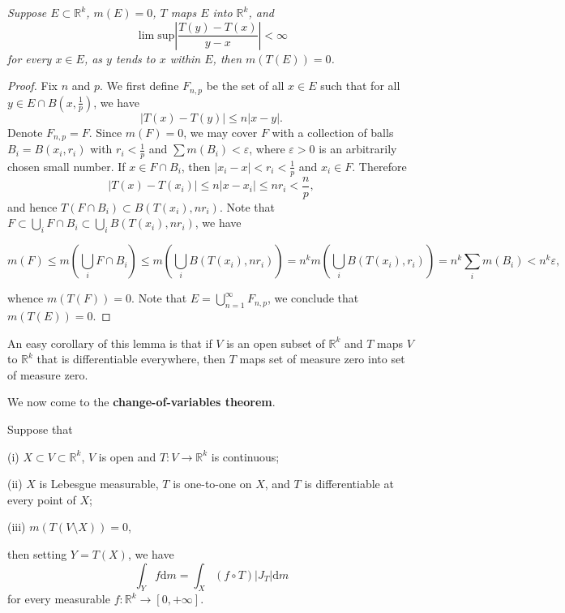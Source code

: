 \begin{lemma}\em
Suppose $E\subset\mathbb{R}^k$, $m(E)=0$, $T$ maps $E$ into $\mathbb{R}^k$, and 
$$
\lim\mathrm{sup}\left| \frac{T\left( y \right) -T\left( x \right)}{y-x} \right|<\infty 
$$
for every $x\in E$, as $y$ tends to $x$ within $E$, then $m(T(E))=0$.
\end{lemma}
\begin{proof}
Fix $n$ and $p$. We first define $F_{n,p}$ be the set of all $x\in E$ such that for all $y\in E\cap B\left(x,\frac{1}{p}\right)$, we have 
$$
\left| T\left( x \right) -T\left( y \right) \right|\le n\left| x-y \right|.
$$
Denote $F_{n,p}=F$. Since $m(F)=0$, we may cover $F$ with a collection of balls $B_i=B(x_i,r_i)$ with $r_i<\frac{1}{p}$ and $\sum m(B_i)<\varepsilon$, where $\varepsilon>0$ is an arbitrarily chosen small number. If $x\in F\cap B_i$, then $|x_i-x|<r_i<\frac{1}{p}$ and $x_i\in F$. Therefore 
$$
\left| T\left( x \right) -T\left( x_i \right) \right|\le n\left| x-x_i \right|\le nr_i<\frac{n}{p},
$$
and hence $T(F\cap B_i)\subset B(T(x_i),nr_i)$. Note that $F\subset\bigcup_iF\cap B_i\subset\bigcup_iB(T(x_i),nr_i)$, we have 
\begin{small}
$$
m\left( F \right) \le m\left( \bigcup_i{F\cap B_i} \right) \le m\left( \bigcup_i{B\left( T\left( x_i \right) ,nr_i \right)} \right) =n^km\left( \bigcup_i{B\left( T\left( x_i \right) ,r_i \right)} \right) =n^k\sum_i{m\left( B_i \right)}<n^k\varepsilon ,
$$
\end{small}
whence $m(T(F))=0$. Note that $E=\bigcup_{n=1}^\infty F_{n,p}$, we conclude that $m(T(E))=0$.
\end{proof}
An easy corollary of this lemma is that if $V$ is an open subset of $\mathbb{R}^k$ and $T$ maps $V$ to $\mathbb{R}^k$ that is differentiable everywhere, then $T$ maps set of measure zero into set of measure zero.\par
We now come to the \textbf{change-of-variables theorem}.
\begin{theorem}
Suppose that \par
(i) $X\subset V\subset\mathbb{R}^k$, $V$ is open and $T:V\to\mathbb{R}^k$ is continuous;\par
(ii) $X$ is Lebesgue measurable, $T$ is one-to-one on $X$, and $T$ is differentiable at every point of $X$;\par
(iii) $m(T(V\setminus X))=0$,\par
then setting $Y=T(X)$, we have 
$$
\int_Y{f\mathrm{d}m}=\int_X{\left( f\circ T \right) \left| J_T \right|\mathrm{d}m}
$$
for every measurable $f:\mathbb{R}^k\to[0,+\infty]$.
\end{theorem}
